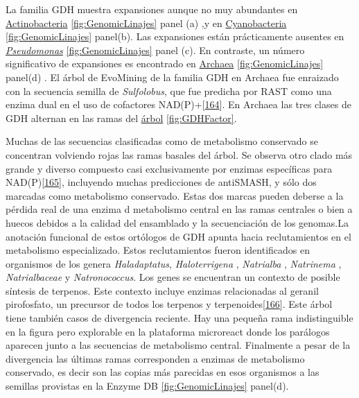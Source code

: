 \documentclass[12pt,twoside]{reedthesis}
\begin{document}
  La familia GDH muestra expansiones aunque no muy abundantes en
  \href{https://microreact.org/project/r1IhjVm6X?tt=cr}{Actinobacteria}
  \autoref{fig:GenomicLinajes} panel (a) ,y en
  \href{https://microreact.org/project/HyjYUN7pQ?tt=cr}{Cyanobacteria}
  \autoref{fig:GenomicLinajes} panel(b). Las expansiones están
  prácticamente ausentes en
  \href{https://microreact.org/project/HyjYUN7pQ?tt=cr}{\emph{Pseudomonas}}
  \autoref{fig:GenomicLinajes} panel (c). En contraste, un número
  significativo de expansiones es encontrado en
  \href{https://microreact.org/project/ByUcvNmaX?tt=cr}{Archaea}
  \autoref{fig:GenomicLinajes} panel(d) . El árbol de EvoMining de la
  familia GDH en Archaea fue enraizado con la secuencia semilla de
  \emph{Sulfolobus}, que fue predicha por RAST como una enzima dual en el
  uso de cofactores
  NAD(P)+{[}\protect\hyperlink{ref-consalvi_glutamate_1991}{164}{]}. En
  Archaea las tres clases de GDH alternan en las ramas del
  \href{https://microreact.org/project/ByUcvNmaX?tt=cr}{árbol}
  \autoref{fig:GDHFactor}.
  
  Muchas de las secuencias clasificadas como de metabolismo conservado se
  concentran volviendo rojas las ramas basales del árbol. Se observa otro
  clado más grande y diverso compuesto casi exclusivamente por enzimas
  específicas para
  NAD(P){[}\protect\hyperlink{ref-ferrer_nadp-glutamate_1996}{165}{]},
  incluyendo muchas predicciones de antiSMASH, y sólo dos marcadas como
  metabolismo conservado. Estas dos marcas pueden deberse a la pérdida
  real de una enzima d metabolismo central en las ramas centrales o bien a
  huecos debidos a la calidad del ensamblado y la secuenciación de los
  genomas.La anotación funcional de estos ortólogos de GDH apunta hacia
  reclutamientos en el metabolismo especializado. Estos reclutamientos
  fueron identificados en organismos de los genera \emph{Haladaptatus},
  \emph{Haloterrigena} , \emph{Natrialba} , \emph{Natrinema} ,
  \emph{Natrialbaceae} y \emph{Natronococcus}. Los genes se encuentran un
  contexto de posible síntesis de terpenos. Este contexto incluye enzimas
  relacionadas al geranil pirofosfato, un precursor de todos los terpenos
  y terpenoides{[}\protect\hyperlink{ref-tholl_terpene_2006}{166}{]}. Este
  árbol tiene también casos de divergencia reciente. Hay una pequeña rama
  indistinguible en la figura pero explorable en la plataforma microreact
  donde los parálogos aparecen junto a las secuencias de metabolismo
  central. Finalmente a pesar de la divergencia las últimas ramas
  corresponden a enzimas de metabolismo conservado, es decir son las
  copias más parecidas en esos organismos a las semillas provistas en la
  Enzyme DB \autoref{fig:GenomicLinajes} panel(d).
  
\end{document}
